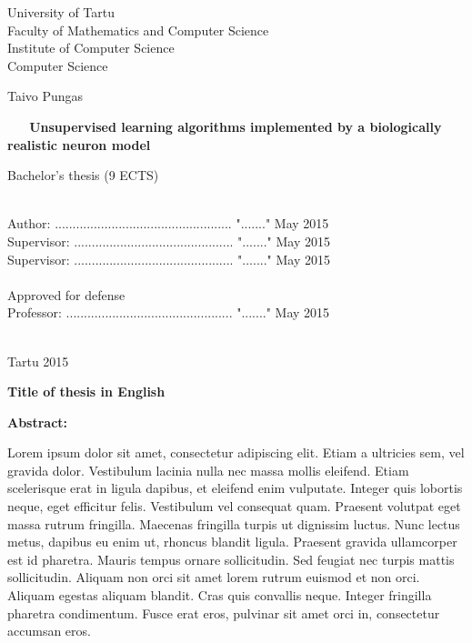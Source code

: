 \documentclass[a4paper,12pt]{report}
\theoremstyle{definition}
\begin{document}
\begin{center}
	{\Large
	University of Tartu\\
	Faculty of Mathematics and Computer Science\\
	Institute of Computer Science\\
	Computer Science\\}
	
	\vspace{2.5cm}
	
	{\LARGE Taivo Pungas}\\
	\vspace{0.5cm}
	\begin{spacing}{2}{\Huge\bf \ \ \ Unsupervised learning algorithms implemented by a biologically realistic neuron model}\end{spacing}
	\vspace{0.5cm}
	{\LARGE Bachelor's thesis (9 ECTS)}
\end{center}
\vspace{3cm}
\hspace{7.2cm}{\Large Supervisors: Dr. Raul Vicente\\}
\vspace{-0.5cm}

\hspace{10.4cm}{\Large Dr. Jaan Aru \\}

\ \\
Author: .................................................. "......." May 2015\\
Supervisor: ............................................. "......." May 2015\\
Supervisor: ............................................. "......." May 2015\\
\ \\
Approved for defense\\
Professor: ............................................... "......." May 2015\\
\ \\
\begin{center}
	{\Large Tartu 2015}
\end{center}
\thispagestyle{empty}
\pagebreak




{\textbf
{\Large Title of thesis in English}}

\textbf{Abstract:}

Lorem ipsum dolor sit amet, consectetur adipiscing elit. Etiam a ultricies sem, vel gravida dolor. Vestibulum lacinia nulla nec massa mollis eleifend. Etiam scelerisque erat in ligula dapibus, et eleifend enim vulputate. Integer quis lobortis neque, eget efficitur felis. Vestibulum vel consequat quam. Praesent volutpat eget massa rutrum fringilla. Maecenas fringilla turpis ut dignissim luctus. Nunc lectus metus, dapibus eu enim ut, rhoncus blandit ligula. Praesent gravida ullamcorper est id pharetra. Mauris tempus ornare sollicitudin. Sed feugiat nec turpis mattis sollicitudin. Aliquam non orci sit amet lorem rutrum euismod et non orci. Aliquam egestas aliquam blandit. Cras quis convallis neque. Integer fringilla pharetra condimentum. Fusce erat eros, pulvinar sit amet orci in, consectetur accumsan eros.
\end{document}
